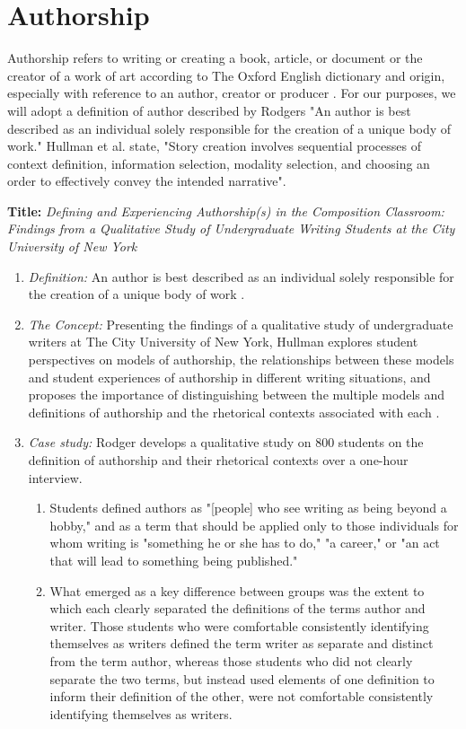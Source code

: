 \documentclass{egpubl}
\begin{document}
\section{Authorship}
Authorship refers to writing or creating a book, article, or document or the creator of a work of art according to The Oxford English dictionary\cite{authoship2} and origin, especially with reference to an author, creator or producer \cite{authoship1}. For our purposes, we will adopt a definition of author described by Rodgers\cite{rodgers2011} "An author is best described as an individual solely responsible for the creation of a unique body of work."  Hullman \cite{hullman2013deeper} et al. state, "Story creation involves sequential processes of context definition, information selection, modality selection, and choosing an order to effectively convey the intended narrative".

\textbf{Title:} \textit{Defining and Experiencing Authorship(s) in the Composition Classroom: Findings from a Qualitative Study of Undergraduate
Writing Students at the City University of New York}
\begin{enumerate}
\item \textit{Definition:} An author is best described as an individual solely responsible for the creation of a unique body of work \cite{rodgers2011}.
\item \textit{The Concept:} Presenting the findings of a qualitative study of undergraduate writers at The City University of New York, Hullman explores student perspectives on models of authorship, the relationships between these models and student experiences of authorship in different writing situations, and proposes the importance of distinguishing between the multiple models and definitions of authorship and the rhetorical contexts associated with each \cite{rodgers2011}.
\item \textit{Case study:}
Rodger develops a qualitative study on 800 students on the definition of authorship and their rhetorical contexts over a one-hour interview.
\begin{enumerate}
\item Students defined authors as "[people] who see writing as being beyond a hobby," and as a term that should be applied only to those
individuals for whom writing is "something he or she has to do," "a career," or "an act that will lead to something being published."
\item What emerged as a key difference between groups was the extent to which each clearly separated the definitions of the terms author and writer. Those students who were comfortable consistently identifying themselves as writers defined the term writer as separate and distinct from the term author, whereas those students who did not clearly separate the two terms, but instead used elements of one definition to inform their definition of the other, were not comfortable consistently identifying themselves as writers.
\end{enumerate}
\end{enumerate}
\end{document}
